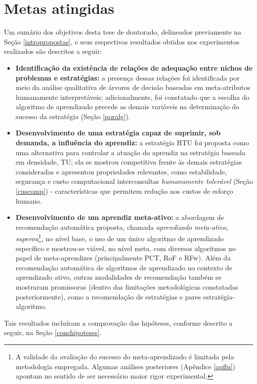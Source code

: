 \section{Metas atingidas}\label{metas}
Um sumário dos objetivos desta tese de doutorado, delineados previamente na Seção \ref{intropropostas}, e seus respectivos resultados obtidos nos experimentos realizados são descritos a seguir:
\begin{itemize}
   \item \textbf{Identificação da existência de relações de adequação entre nichos de problemas e estratégias:} a presença dessas relações foi identificada por meio da análise qualitativa de árvores de decisão baseadas em meta-atributos humanamente interpretáveis; adicionalmente, foi constatado que a escolha do algoritmo de aprendizado precede as demais variáveis na determinação do sucesso da estratégia (Seção \ref{poralg}).
   \item \textbf{Desenvolvimento de uma estratégia capaz de suprimir, sob demanda, a influência do aprendiz:} a estratégia HTU foi proposta como uma alternativa para controlar a atuação do aprendiz na estratégia baseada em densidade, TU; ela se mostrou competitiva frente às demais estratégias consideradas e apresentou propriedades relevantes, como estabilidade, segurança e custo computacional interconsultas \textit{humanamente tolerável} (Seção \ref{cuscomp}) - características que permitem redução nos custos de esforço humano.
   \item \textbf{Desenvolvimento de um aprendiz meta-ativo:} a abordagem de recomendação automática proposta, chamada \textit{aprendizado meta-ativo}, \textit{superou}\footnote{A validade da avaliação do sucesso do meta-aprendizado é limitada pela metodologia empregada. Algumas análises posteriores (Apêndice \ref{apflu}) apontam no sentido de ser necessário maior rigor experimental.}, no nível base, o uso de um único algoritmo de aprendizado específico e mostrou-se viável, no nível meta, com diversos algoritmos no papel de meta-aprendizes (principalmente PCT, RoF e RFw).
   Além da recomendação automática de algoritmos de aprendizado no contexto de aprendizado ativo, outras modalidades de recomendação também se mostraram promissoras (dentro das limitações metodológicas constatadas posteriormente), como a recomendação de estratégias e pares estratégia-algoritmo.
\end{itemize}
Tais resultados incluíram a comprovação das hipóteses, conforme descrito a seguir, na Seção \ref{conchipoteses}.

